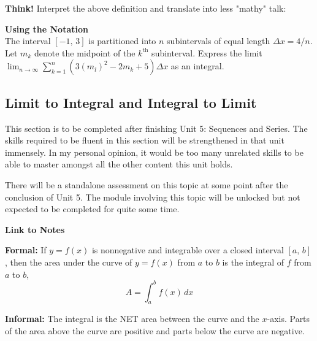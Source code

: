 \documentclass[addpoints, 12pt]{exam}
\begin{document}
\noindent\textbf{Think!} Interpret the above definition and translate into less "mathy" talk:


\textbf{Using the Notation}\\
The interval $[-1,\,3]$ is partitioned into $n$ subintervals of equal length $\Delta x=4/n$. Let $m_k$ denote the midpoint of the $k^{\text{th}}$ subinterval. Express the limit $\displaystyle\lim_{n\to\infty}\sum_{k=1}^n \left( 3\left(m_l\right)^2-2m_k +5 \right)\Delta x$ as an integral.

\newpage

\subsection*{Limit to Integral and Integral to Limit}
This section is to be completed after finishing Unit 5: Sequences and Series. The skills required to be fluent in this section will be strengthened in that unit immensely. In my personal opinion, it would be too many unrelated skills to be able to master amongst all the other content this unit holds.

There will be a standalone assessment on this topic at some point after the conclusion of Unit 5. The module involving this topic will be unlocked but not expected to be completed for quite some time.

\begin{center}
    \hspace{0pt}
    \vfill
    \textbf{Link to Notes}
    \vspace{.7cm}
    
    \vfill
    \hspace{0pt}
\end{center}

\newpage

\begin{tcolorbox}[title= DEFINITION OF THE DEFINITE INTEGRAL,colframe=black,sharp corners,colback=white,colbacktitle=white,coltitle=black,boxrule=1pt]

     \textbf{Formal:} If $y=f(x)$ is nonnegative and integrable over a closed interval $[a,\,b]$, then the area under the curve of $y=f(x)$ from $a$ to $b$ is the integral of $f$ from $a$ to $b$,
     \[A=\int_a^b f(x)\,dx\]
     
     \textbf{Informal:} The integral is the NET area between the curve and the $x$-axis. Parts of the area above the curve are positive and parts below the curve are negative.
    
\end{tcolorbox}
\end{document}
